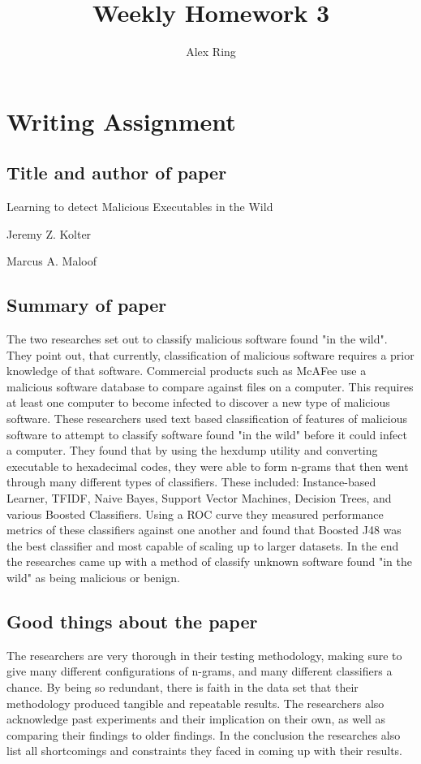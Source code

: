 \documentclass[11pt, oneside]{article}   	%
\title{Weekly Homework 3}
\author{Alex Ring}
\date{}							%
\begin{document}
\maketitle
\section{Writing Assignment}
\subsection{Title and author of paper}
Learning to detect Malicious Executables in the Wild

Jeremy Z. Kolter

Marcus A. Maloof
\subsection{Summary of paper}
The two researches set out to classify malicious software found "in the wild". They point out, that currently, classification of malicious software requires a prior knowledge of that software. Commercial products such as McAFee use a malicious software database to compare against files on a computer. This requires at least one computer to become infected to discover a new type of malicious software. These researchers used text based classification of features of malicious software to attempt to classify software found "in the wild" before it could infect a computer. They found that by using the hexdump utility and converting executable to hexadecimal codes, they were able to form n-grams that then went through many different types of classifiers. These included: Instance-based Learner, TFIDF, Naive Bayes, Support Vector Machines, Decision Trees, and various Boosted Classifiers. Using a ROC curve they measured performance metrics of these classifiers against one another and found that Boosted J48 was the best classifier and most capable of scaling up to larger datasets. In the end the researches came up with a method of classify unknown software found "in the wild" as being malicious or benign. 

\subsection{Good things about the paper}
The researchers are very thorough in their testing methodology, making sure to give many different configurations of n-grams, and many different classifiers a chance. By being so redundant, there is faith in the data set that their methodology produced tangible and repeatable results. The researchers also acknowledge past experiments and their implication on their own, as well as comparing their findings to older findings. In the conclusion the researches also list all shortcomings and constraints they faced in coming up with their results. 
\end{document}
